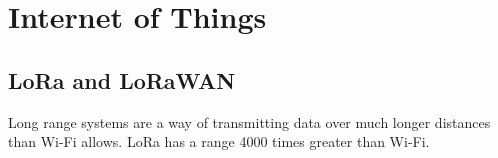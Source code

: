 \section{Internet of Things}

\subsection{LoRa and LoRaWAN}

Long range systems are a way of transmitting data over much longer distances than
Wi-Fi allows. LoRa has a range 4000 times greater than Wi-Fi.

